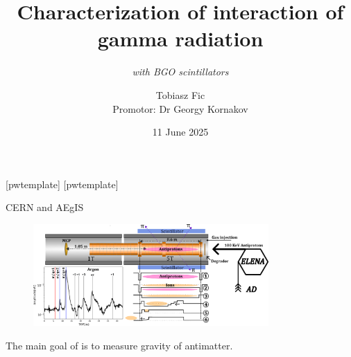 


\title{Characterization of interaction of gamma radiation }
    \subtitle{\textit{with BGO scintillators}}
\author[T. Fic]{Tobiasz Fic\\ \vspace{5pt} \footnotesize Promotor: Dr Georgy Kornakov}

\date{11 June 2025}



\begin{frame}
    \maketitle
\end{frame}

[pwtemplate]
[pwtemplate]

\begin{frame}{CERN and AEgIS}
    \begin{figure}
        \centering
        \includegraphics[width=0.8\textwidth, frame]{images/AEGIS_IonTrap.png}
    \end{figure}
    The main goal of \aegis is to measure gravity of antimatter.
\end{frame}

